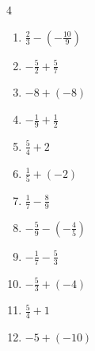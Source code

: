 \begin{multicols}{4}
\begin{enumerate}
\columnbreak %

  \item $\displaystyle \frac{2}{3} - \left(-\frac{10}{9}\right)$


  \item $\displaystyle -\frac{5}{2} + \frac{5}{7}$


  \item $\displaystyle -8 + \left(-8\right)$

        \phantom{$\displaystyle =-16$}

  \item $\displaystyle -\frac{1}{9} + \frac{1}{2}$


  \item $\displaystyle \frac{5}{4} + 2$


  \item $\displaystyle \frac{1}{5} + \left(-2\right)$


  \item $\displaystyle \frac{1}{7} - \frac{8}{9}$


  \item $\displaystyle -\frac{5}{9} - \left(-\frac{4}{5}\right)$


  \item $\displaystyle -\frac{1}{7} - \frac{5}{3}$


  \item $\displaystyle -\frac{5}{3} + \left(-4\right)$


\columnbreak %

  \item $\displaystyle \frac{5}{4} + 1$


  \item $\displaystyle -5 + \left(-10\right)$


\end{enumerate}
\end{multicols}
